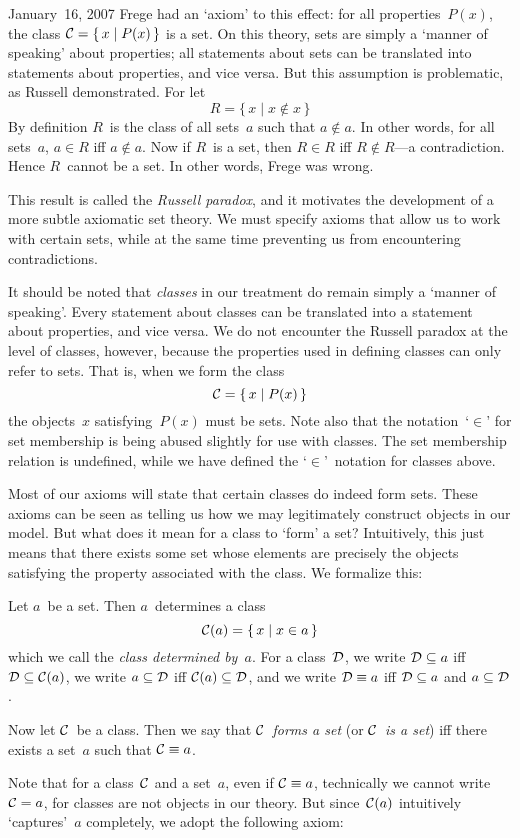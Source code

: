 \begin{lecture}{January~16, 2007}
Frege had an `axiom' to this effect: for all properties~\(P(x)\), the class \(\mathcal{C}=\{\,x\mid P(x)\,\}\) is a set. On this theory, sets are simply a `manner of speaking' about properties; all statements about sets can be translated into statements about properties, and vice versa. But this assumption is problematic, as Russell demonstrated. For let
\[R=\{\,x\mid x\not\in x\,\}\]
By definition \(R\)~is the class of all sets~\(a\) such that \(a\not\in a\). In other words, for all sets~\(a\), \(a\in R\) iff \(a\not\in a\). Now if \(R\)~is a set, then \(R\in R\) iff \(R\not\in R\)---a contradiction. Hence \(R\)~cannot be a set. In other words, Frege was wrong.

This result is called the \emph{Russell paradox}, and it motivates the development of a more subtle axiomatic set theory. We must specify axioms that allow us to work with certain sets, while at the same time preventing us from encountering contradictions.

It should be noted that \emph{classes} in our treatment do remain simply a `manner of speaking'. Every statement about classes can be translated into a statement about properties, and vice versa. We do not encounter the Russell paradox at the level of classes, however, because the properties used in defining classes can only refer to sets. That is, when we form the class
\[\mathcal{C}=\{\,x\mid P(x)\,\}\]
the objects~\(x\) satisfying~\(P(x)\) must be sets. Note also that the notation~`\(\in\)' for set membership is being abused slightly for use with classes. The set membership relation is undefined, while we have defined the `\(\in\)'~notation for classes above.

Most of our axioms will state that certain classes do indeed form sets. These axioms can be seen as telling us how we may legitimately construct objects in our model. But what does it mean for a class to `form' a set? Intuitively, this just means that there exists some set whose elements are precisely the objects satisfying the property associated with the class. We formalize this:
\begin{defn} Let \(a\)~be a set. Then \(a\)~determines a class
\[\mathcal{C}(a)=\{\,x\mid x\in a\,\}\]
which we call the \emph{class determined by~\(a\)}. For a class~\(\mathcal{D}\), we write \(\mathcal{D}\subseteq a\) iff \(\mathcal{D}\subseteq\mathcal{C}(a)\), we write \(a\subseteq\mathcal{D}\) iff \(\mathcal{C}(a)\subseteq\mathcal{D}\), and we write \(\mathcal{D}\equiv a\) iff \(\mathcal{D}\subseteq a\) and \(a\subseteq\mathcal{D}\).

Now let \(\mathcal{C}\)~be a class. Then we say that \emph{\(\mathcal{C}\)~forms a set} (or \emph{\(\mathcal{C}\)~is a set}) iff there exists a set~\(a\) such that \(\mathcal{C}\equiv a\).
\end{defn}
\noindent Note that for a class~\(\mathcal{C}\) and a set~\(a\), even if \(\mathcal{C}\equiv a\), technically we cannot write \(\mathcal{C}=a\), for classes are not objects in our theory. But since~\(\mathcal{C}(a)\) intuitively `captures'~\(a\) completely, we adopt the following axiom:


\end{lecture}
